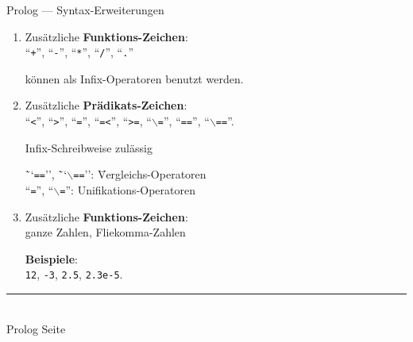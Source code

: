 \documentclass{slides}
\newcommand{\myrule}{\rule{20cm}{1mm}\\ }
\newcounter{mypage}
\begin{document}
\begin{slide}{}
\normalsize
\begin{center}
Prolog --- Syntax-Erweiterungen
\end{center}
\vspace{0.5cm}

\footnotesize
\begin{enumerate}
\item Zus\"{a}tzliche \textbf{Funktions-Zeichen}: \\[0.3cm]
      \hspace*{1.3cm} 
      ``\texttt{+}'', ``\texttt{-}'', ``\texttt{*}'', ``\texttt{/}'', ``\texttt{.}'' 

      k\"{o}nnen als Infix-Operatoren benutzt werden.
\item Zus\"{a}tzliche \textbf{Pr\"{a}dikats-Zeichen}: \\[0.3cm]
      \hspace*{1.3cm} 
      ``\texttt{<}'', ``\texttt{>}'', ``\texttt{=}'', ``\texttt{=<}'', ``\texttt{>=}, 
      ``\texttt{$\backslash$=}'', ``\texttt{==}'', ``\texttt{$\backslash$==}''.

      Infix-Schreibweise zul\"{a}ssig
      
      \begin{tabbing}
      \hspace*{1.3cm} \= ``\texttt{==}'', \= ``\texttt{$\backslash$==}'': \= Vergleichs-Operatoren \\[0.3cm]
                      \> ``\texttt{=}'',  \> ``\texttt{$\backslash$=}'':  \> Unifikations-Operatoren        
      \end{tabbing}

\item Zus\"{a}tzliche \textbf{Funktions-Zeichen}: \\[0.3cm] 
      \hspace*{1.3cm} ganze Zahlen, Flie\3komma-Zahlen

      \textbf{Beispiele}: 
      \\[0.3cm]
      \hspace*{1.3cm}
      \texttt{12}, \texttt{-3}, \texttt{2.5}, \texttt{2.3e-5}.
\end{enumerate}



\vspace*{\fill}
\tiny \addtocounter{mypage}{1}
\myrule
Prolog  \hspace*{\fill} Seite 
\end{slide}
\end{document}
